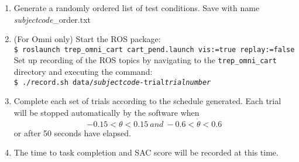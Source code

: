 \documentclass[11pt]{article}
\begin{document}
\begin{enumerate}
\item Generate a randomly ordered list of test conditions. Save with name \textsl{\textsf{subjectcode}}\_order.txt
\item (For Omni only) Start the ROS package:\\
\texttt{\$ roslaunch trep\_omni\_cart cart\_pend.launch vis:=true replay:=false}\\ Set up recording of the ROS topics by navigating to the \texttt{trep\_omni\_cart} directory and executing the command:\\ \texttt{\$ ./record.sh data/\textsl{\textsf{subjectcode}}-trial\textsl{\textsf{trialnumber}}}
\item Complete each set of trials according to the schedule generated. Each trial will be stopped automatically by the software when $$-0.15<\theta<0.15\ and\ -0.6<\dot{\theta}<0.6$$ or after 50 seconds have elapsed.

\item The time to task completion and SAC score will be recorded at this time.
\end{enumerate}
\end{document}
